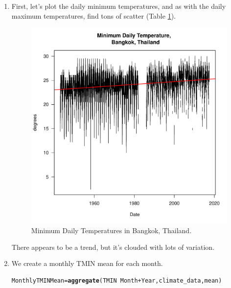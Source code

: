 \documentclass{article}\usepackage[]{graphicx}\usepackage[]{color}
\makeatletter
\def\maxwidth{ %
  \ifdim\Gin@nat@width>\linewidth
    \linewidth
  \else
    \Gin@nat@width
  \fi
}
\newcommand{\hlopt}[1]{\textcolor[rgb]{0,0,0}{#1}}%
\newcommand{\hlstd}[1]{\textcolor[rgb]{0.345,0.345,0.345}{#1}}%
\newcommand{\hlkwb}[1]{\textcolor[rgb]{0.69,0.353,0.396}{#1}}%
\newcommand{\hlkwd}[1]{\textcolor[rgb]{0.737,0.353,0.396}{\textbf{#1}}}%
\newenvironment{kframe}{%
 \def\at@end@of@kframe{}%
 \ifinner\ifhmode%
  \def\at@end@of@kframe{\end{minipage}}%
  \begin{minipage}{\columnwidth}%
 \fi\fi%
 \def\FrameCommand##1{\hskip\@totalleftmargin \hskip-\fboxsep
 \colorbox{shadecolor}{##1}\hskip-\fboxsep
     \hskip-\linewidth \hskip-\@totalleftmargin \hskip\columnwidth}%
 \MakeFramed {\advance\hsize-\width
   \@totalleftmargin\z@ \linewidth\hsize
   \@setminipage}}%
 {\par\unskip\endMakeFramed%
 \at@end@of@kframe}
\newenvironment{knitrout}{}{} %
\makeatother
\begin{document}
\begin{enumerate}

\item First, let's plot the daily minimum temperatures, and as with the daily maximum temperatures, find tons of scatter (Table \ref{fig:TMIN_trend}).

\begin{figure}
\label{fig:TMIN_trend}
\caption{Minimum Daily Temperatures in Bangkok, Thailand.}
\begin{knitrout}
\color{fgcolor}
\includegraphics[width=\maxwidth]{figure/unnamed-chunk-6-1} 

\end{knitrout}
\end{figure}

There appears to be a trend, but it's clouded with lots of variation. 

  \item We create a monthly TMIN mean for each month.

\begin{knitrout}
\color{fgcolor}\begin{kframe}
\begin{alltt}
\hlstd{MonthlyTMINMean} \hlkwb{=} \hlkwd{aggregate}\hlstd{(TMIN} \hlopt{~} \hlstd{Month} \hlopt{+} \hlstd{Year, climate_data, mean)}


\end{alltt}
\end{kframe}
\end{knitrout}
\end{enumerate}
\end{document}
